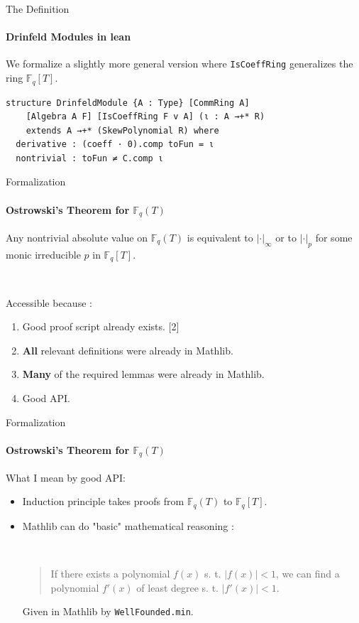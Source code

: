 \begin{frame}[fragile]{The Definition}
	\framesubtitle{Drinfeld Modules in lean}

We formalize a slightly more general version where \texttt{IsCoeffRing} generalizes the ring $\mathbb{F}_q[T]$.

        \begin{verbatim}
structure DrinfeldModule {A : Type} [CommRing A]
    [Algebra A F] [IsCoeffRing F v A] (ι : A →+* R)
    extends A →+* (SkewPolynomial R) where
  derivative : (coeff · 0).comp toFun = ι
  nontrivial : toFun ≠ C.comp ι
        \end{verbatim}
\end{frame}

\begin{frame}{Formalization}
	\framesubtitle{Ostrowski's Theorem for $\mathbb{F}_q(T)$}

        \begin{theorem}
            Any nontrivial absolute value on $\mathbb{F}_q(T)$ is equivalent to $| \cdot |_\infty$ or to $| \cdot |_p$ for some monic irreducible $p$ in $\mathbb{F}_q[T]$.
        \end{theorem}
        \ 
        
        Accessible because :
        \begin{enumerate}
            \item Good proof script already exists. [2]
            \item \textbf{All} relevant definitions were already in Mathlib.
            \item \textbf{Many} of the required lemmas were already in Mathlib.
            \item Good API.
        \end{enumerate}
\end{frame}

\begin{frame}[fragile]{Formalization}
	\framesubtitle{Ostrowski's Theorem for $\mathbb{F}_q(T)$}

        What I mean by good API:
        \begin{itemize}
            \item Induction principle takes proofs from $\mathbb{F}_q(T)$ to $\mathbb{F}_q[T]$.
            \item Mathlib can do "basic" mathematical reasoning :

            \ 

            \begin{quote}
                If there exists a polynomial $f(x)$ s. t. $|f(x)| < 1$, we can find a polynomial $f'(x)$ of least degree s. t. $|f'(x)| <1 $.
            \end{quote}
            Given in Mathlib by \texttt{WellFounded.min}.
            
        \end{itemize}
\end{frame}

